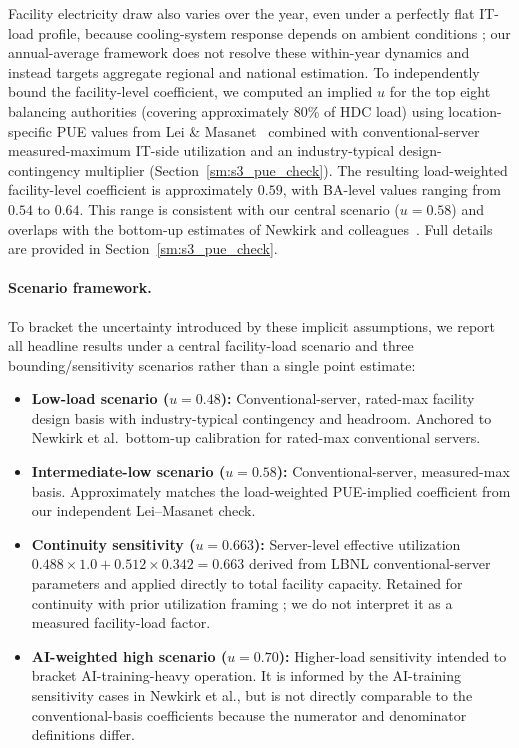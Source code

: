 \documentclass[12pt]{article}
\begin{document}
Facility electricity draw also varies over the year, even under a perfectly flat IT-load profile, because cooling-system response depends on ambient conditions \cite{lei2022climatepue}; our annual-average framework does not resolve these within-year dynamics and instead targets aggregate regional and national estimation. To independently bound the facility-level coefficient, we computed an implied $u$ for the top eight balancing authorities (covering approximately 80\% of HDC load) using location-specific PUE values from Lei \& Masanet~\cite{lei2022climatepue} combined with conventional-server measured-maximum IT-side utilization and an industry-typical design-contingency multiplier (Section~\ref{sm:s3_pue_check}). The resulting load-weighted facility-level coefficient is approximately $0.59$, with BA-level values ranging from $0.54$ to $0.64$. This range is consistent with our central scenario ($u = 0.58$) and overlaps with the bottom-up
estimates of Newkirk and colleagues~\cite{newkirk2024microgrid}.
Full details are provided in Section~\ref{sm:s3_pue_check}.

\paragraph{Scenario framework.}
To bracket the uncertainty introduced by these implicit assumptions, we report all headline results under a central facility-load scenario and three bounding/sensitivity scenarios rather than a
single point estimate:
\begin{itemize}
    \item \textbf{Low-load scenario ($u = 0.48$):} Conventional-server,
    rated-max facility design basis with industry-typical contingency and
    headroom. Anchored to Newkirk et al.\ bottom-up calibration for
    rated-max conventional servers.
    \item \textbf{Intermediate-low scenario ($u = 0.58$):} Conventional-server,
    measured-max basis. Approximately matches the load-weighted PUE-implied
    coefficient from our independent Lei--Masanet check.
    \item \textbf{Continuity sensitivity ($u = 0.663$):} Server-level
    effective utilization $0.488\times1.0 + 0.512\times0.342 = 0.663$ derived
    from LBNL conventional-server parameters and applied directly to total
    facility capacity. Retained for continuity with prior utilization framing
    \cite{Shehabi2024DataCenter,Shehabi2016DataCenter}; we do not interpret it
    as a measured facility-load factor.
    \item \textbf{AI-weighted high scenario ($u = 0.70$):} Higher-load
    sensitivity intended to bracket AI-training-heavy operation. It is informed
    by the AI-training sensitivity cases in Newkirk et al., but is not directly
    comparable to the conventional-basis coefficients because the numerator and
    denominator definitions differ.
\end{itemize}
\end{document}
